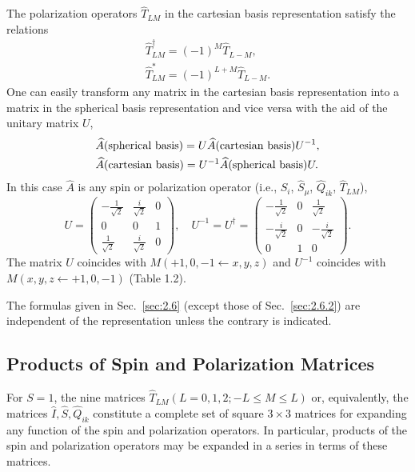 The polarization operators $\widehat{T}_{L M}$ in the cartesian basis representation satisfy the relations
\begin{gather}
\widehat{T}_{L M}^{\dagger}=(-1)^{M} \widehat{T}_{L-M} , \label{eq:2:6:34}\\
\widehat{T}_{L M}^{*}=(-1)^{L+M} \widehat{T}_{L-M}. \label{eq:2:6:35}
\end{gather}
One can easily transform any matrix in the cartesian basis representation into a matrix in the spherical basis representation and vice versa with the aid of the unitary matrix $U$,
\begin{align}
& \widehat{A}(\text{spherical basis})=U \widehat{A}(\text{cartesian basis}) U^{-1} , \notag\\
& \widehat{A}(\text{cartesian basis})=U^{-1} \widehat{A}(\text{spherical basis}) U .\label{eq:2:6:36}
\end{align}
In this case $\widehat{A}$ is any spin or polarization operator (i.e., $\widehat{S}_{i}$, $\widehat{S}_{\mu}$, $\widehat{Q}_{i k}$, $\widehat{T}_{L M}$),
\begin{equation}
U=\begin{pmatrix}
-\frac{1}{\sqrt{2}} & \frac{i}{\sqrt{2}} & 0  \label{eq:2:6:37}\\
0 & 0 & 1 \\
\frac{1}{\sqrt{2}} & \frac{i}{\sqrt{2}} & 0
\end{pmatrix}, \quad U^{-1}=U^{\dagger}=\begin{pmatrix}
-\frac{1}{\sqrt{2}} & 0 & \frac{1}{\sqrt{2}} \\
-\frac{i}{\sqrt{2}} & 0 & -\frac{i}{\sqrt{2}} \\
0 & 1 & 0
\end{pmatrix} .
\end{equation}
The matrix $U$ coincides with $M(+1,0,-1 \leftarrow x, y, z)$ and $U^{-1}$ coincides with $M(x, y, z \leftarrow+1,0,-1)$ (Table 1.2).

The formulas given in Sec.~\ref{sec:2.6} (except those of Sec.~\ref{sec:2.6.2}) are independent of the representation unless the contrary is indicated.

\subsection{Products of Spin and Polarization Matrices}
For $S=1$, the nine matrices $\widehat{T}_{L M}(L=0,1,2 ;-L \leq M \leq L)$ or, equivalently, the matrices $\widehat{I}, \widehat{S}, \widehat{Q}_{i k}$ constitute a complete set of square $3 \times 3$ matrices for expanding any function of the spin and polarization operators. In particular, products of the spin and polarization operators may be expanded in a series in terms of these matrices.

